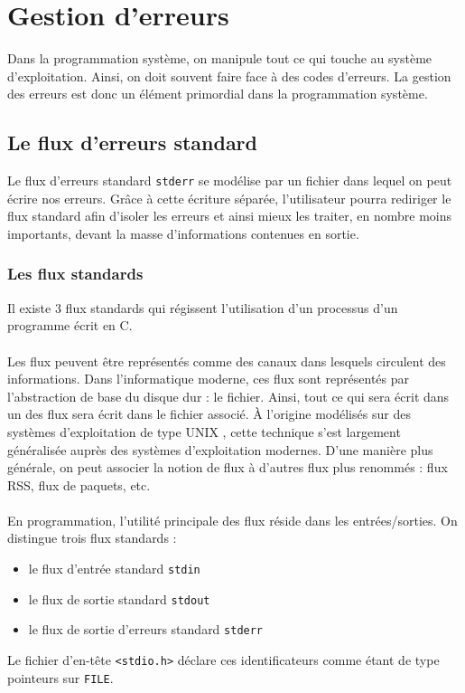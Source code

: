 \section{Gestion d'erreurs}

	Dans la programmation système, on manipule tout ce qui touche au système d'exploitation. Ainsi, on doit souvent faire face à des codes d'erreurs. La gestion des erreurs est donc un élément primordial dans la programmation système.
	
	\subsection{Le flux d'erreurs standard}
		Le flux d'erreurs standard \lstinline!stderr! se modélise par un fichier dans lequel on peut écrire nos erreurs. Grâce à cette écriture séparée, l'utilisateur pourra rediriger le flux standard afin d'isoler les erreurs et ainsi mieux les traiter, en nombre moins importants, devant la masse d'informations contenues en sortie. 
		
		\subsubsection*{Les flux standards}
			Il existe 3 flux standards qui régissent l'utilisation d'un processus d'un programme écrit en C.
			
			\paragraph{} Les flux peuvent être représentés comme des canaux dans lesquels circulent des informations. Dans l'informatique moderne, ces flux sont représentés par l'abstraction de base du disque dur : le fichier. Ainsi, tout ce qui sera écrit dans un des flux sera écrit dans le fichier associé. À l'origine modélisés sur des systèmes d'exploitation de type UNIX , cette technique s'est largement généralisée auprès des systèmes d'exploitation modernes. D'une manière plus générale, on peut associer la notion de flux à d'autres flux plus renommés : flux RSS, flux de paquets, etc.
			
			\paragraph{} En programmation, l'utilité principale des flux réside dans les entrées/sorties. On distingue trois flux standards : 
			\begin{itemize}
				\item le flux d'entrée standard \lstinline!stdin!
				\item le flux de sortie standard \lstinline!stdout!
				\item le flux de sortie d'erreurs standard \lstinline!stderr!
			\end{itemize}
			Le fichier d'en-tête \lstinline!<stdio.h>! déclare ces identificateurs comme étant de type pointeurs sur \lstinline!FILE!.
			
